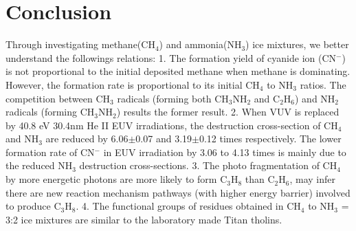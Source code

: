 \section{Conclusion}
Through investigating methane(CH$_4$) and ammonia(NH$_3$) ice mixtures, we better understand the followings relations: 1. The formation yield of cyanide ion (CN$^-$) is not proportional to the initial deposited methane when methane is dominating. However, the formation rate is proportional to its initial CH$_4$ to NH$_3$ ratios. The competition between CH$_3$ radicals (forming both CH$_3$NH$_2$ and C$_2$H$_6$) and NH$_2$ radicals (forming CH$_3$NH$_2$) results the former result. 2. When VUV is replaced by 40.8 eV 30.4nm He II EUV irradiations, the destruction cross-section of CH$_4$ and NH$_3$ are reduced by  6.06$\pm$0.07 and 3.19$\pm$0.12 times respectively. The lower formation rate of CN$^-$ in EUV irradiation by 3.06 to 4.13 times is mainly due to the reduced NH$_3$ destruction cross-sections. 3. The photo fragmentation of CH$_4$ by more energetic photons are more likely to form C$_3$H$_8$ than C$_2$H$_6$, may infer there are new reaction mechanism pathways (with higher energy barrier) involved to produce C$_3$H$_8$. 4. The functional groups of residues obtained in CH$_4$ to NH$_3$ = 3:2 ice mixtures are similar to the laboratory made Titan tholins.


